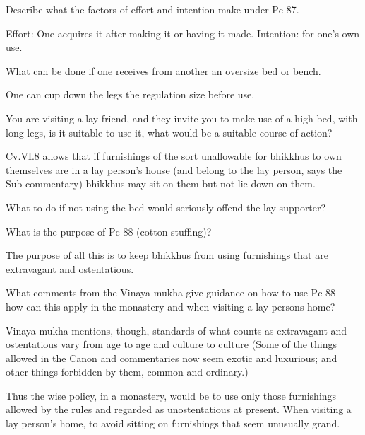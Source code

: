\bigskip

Describe what the factors of effort and intention make under Pc 87.

\begin{solution}
  Effort: One acquires it after making it or having it made. Intention: for
  one’s own use.
\end{solution}

\bigskip

What can be done if one receives from another an oversize bed or bench.

\begin{solution}
  One can cup down the legs the regulation size before use.
\end{solution}

\bigskip

You are visiting a lay friend, and they invite you to make use of a high bed,
with long legs, is it suitable to use it, what would be a suitable course of
action?

\begin{solution}
  Cv.VI.8 allows that if furnishings of the sort unallowable for bhikkhus to own
  themselves are in a lay person’s house (and belong to the lay person, says the
  Sub-commentary) bhikkhus may sit on them but not lie down on them.
\end{solution}

\bigskip

What to do if not using the bed would seriously offend the lay supporter?


What is the purpose of Pc 88 (cotton stuffing)? 

\begin{solution}
  The purpose of all this is to keep bhikkhus from using furnishings that are
  extravagant and ostentatious.
\end{solution}

\bigskip

What comments from the Vinaya-mukha give guidance on how to use Pc 88 – how
can this apply in the monastery and when visiting a lay persons home?

\begin{solution}
  Vinaya-mukha mentions, though, standards of what counts as extravagant and
  ostentatious vary from age to age and culture to culture (Some of the things
  allowed in the Canon and commentaries now seem exotic and luxurious; and other
  things forbidden by them, common and ordinary.)

  Thus the wise policy, in a monastery, would be to use only those furnishings
  allowed by the rules and regarded as unostentatious at present. When visiting
  a lay person’s home, to avoid sitting on furnishings that seem unusually
  grand.
\end{solution}


